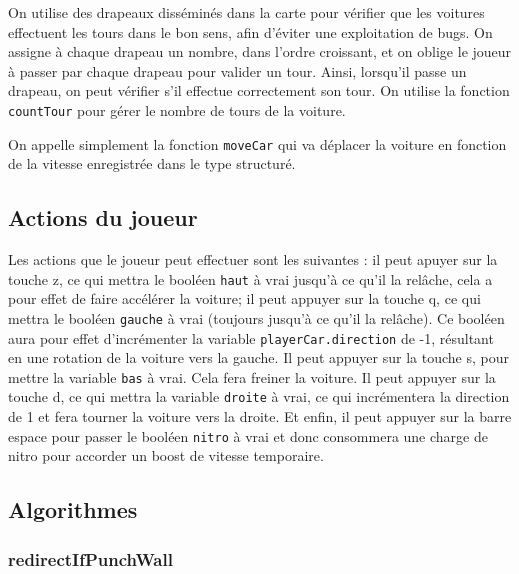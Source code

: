 \documentclass[11pt, final]{report}
\renewcommand{\tt}[1]{\texttt{#1}}
\begin{document}


On utilise des drapeaux disséminés dans la carte pour vérifier que les  voitures effectuent les tours dans le bon sens, afin d'éviter une exploitation de bugs. On assigne à chaque drapeau un nombre, dans l'ordre croissant, et on oblige le joueur à passer par chaque drapeau pour valider un tour. Ainsi, lorsqu'il passe un drapeau, on peut vérifier s'il effectue correctement son tour. On utilise la fonction \tt{countTour} pour gérer le nombre de tours de la voiture.



On appelle simplement la fonction \tt{moveCar} qui va déplacer la voiture en fonction de la vitesse enregistrée dans le type structuré.


\subsection{Actions du joueur}




Les actions que le joueur peut effectuer sont les suivantes : il peut apuyer sur la touche z, ce qui mettra le booléen \tt{haut} à vrai jusqu'à ce qu'il la relâche, cela a pour effet de faire accélérer la voiture; il peut appuyer sur la touche q, ce qui mettra le booléen \tt{gauche} à vrai (toujours jusqu'à ce qu'il la relâche). Ce booléen aura pour effet d'incrémenter la variable \tt{playerCar.direction} de -1, résultant en une rotation de la voiture vers la gauche.
Il peut appuyer sur la touche s, pour mettre la variable \tt{bas} à vrai. Cela fera freiner la voiture. 
Il peut appuyer sur la touche d, ce qui mettra la variable \tt{droite} à vrai, ce qui incrémentera la direction de 1 et fera tourner la voiture vers la droite.
Et enfin, il peut appuyer sur la barre espace pour passer le booléen \tt{nitro} à vrai et donc consommera une charge de nitro pour accorder un boost de vitesse temporaire.
\\

\subsection{Algorithmes}

\subsubsection{redirectIfPunchWall}

\end{document}
